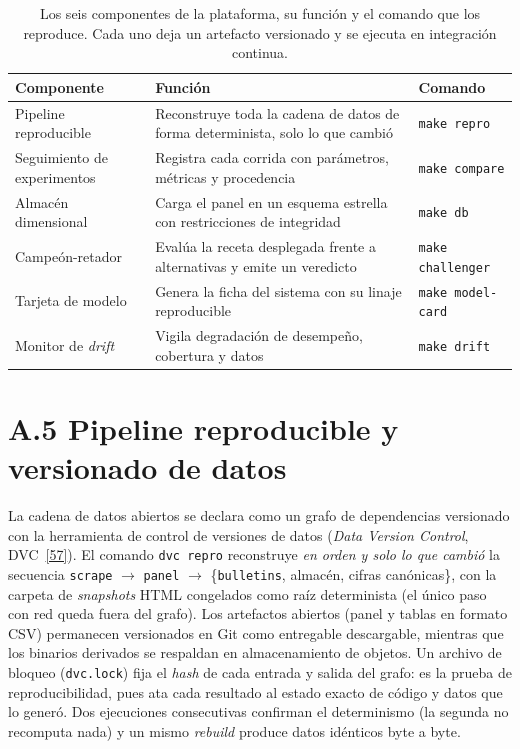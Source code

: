 \documentclass[12pt,letterpaper]{report}
\newcommand{\cita}[1]{\hyperref[bib:#1]{[#1]}}
\begin{document}
\begin{table}[H]
\centering
\footnotesize
\caption[Componentes de la plataforma MLOps]{Los seis componentes de la plataforma, su
funci\'on y el comando que los reproduce. Cada uno deja un artefacto versionado y se ejecuta
en integraci\'on continua.}
\label{tab:mlops_pilares}
\begin{tabular}{@{}p{3.0cm} p{7.6cm} p{2.9cm}@{}}
\toprule
\rowcolor{uacjblue!15}
\textbf{Componente} & \textbf{Funci\'on} & \textbf{Comando} \\ \midrule
Pipeline reproducible & Reconstruye toda la cadena de datos de forma determinista, solo lo que cambi\'o & \texttt{make repro} \\
Seguimiento de experimentos & Registra cada corrida con par\'ametros, m\'etricas y procedencia & \texttt{make compare} \\
Almac\'en dimensional & Carga el panel en un esquema estrella con restricciones de integridad & \texttt{make db} \\
Campe\'on-retador & Eval\'ua la receta desplegada frente a alternativas y emite un veredicto & \texttt{make challenger} \\
Tarjeta de modelo & Genera la ficha del sistema con su linaje reproducible & \texttt{make model-card} \\
Monitor de \textit{drift} & Vigila degradaci\'on de desempe\~no, cobertura y datos & \texttt{make drift} \\
\bottomrule
\end{tabular}
\end{table}

\section{A.5 Pipeline reproducible y versionado de datos}

La cadena de datos abiertos se declara como un grafo de dependencias versionado con la
herramienta de control de versiones de datos (\textit{Data Version Control}, DVC~\cita{57}).
El comando \texttt{dvc repro} reconstruye \textit{en orden y solo lo que cambi\'o} la
secuencia \texttt{scrape} $\to$ \texttt{panel} $\to$ \{\texttt{bulletins}, almac\'en,
cifras canónicas\}, con la carpeta de \textit{snapshots} HTML congelados como ra\'iz
determinista (el \'unico paso con red queda fuera del grafo). Los artefactos abiertos
(panel y tablas en formato CSV) permanecen versionados en Git como entregable descargable,
mientras que los binarios derivados se respaldan en almacenamiento de objetos. Un archivo
de bloqueo (\texttt{dvc.lock}) fija el \textit{hash} de cada entrada y salida del grafo:
es la prueba de reproducibilidad, pues ata cada resultado al estado exacto de c\'odigo y
datos que lo gener\'o. Dos ejecuciones consecutivas confirman el determinismo (la segunda
no recomputa nada) y un mismo \textit{rebuild} produce datos id\'enticos byte a byte.
\end{document}

